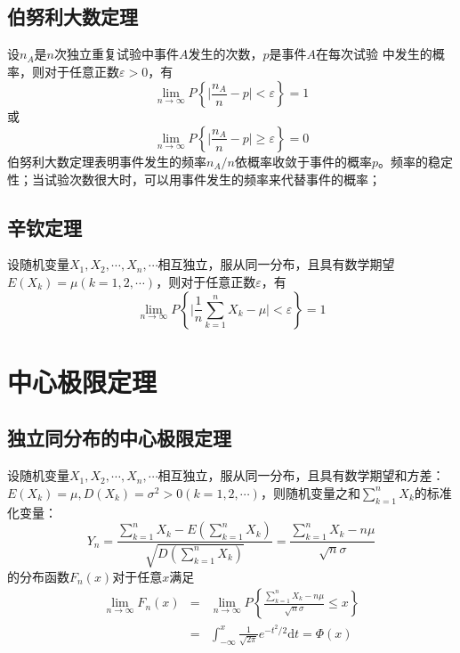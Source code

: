 \documentclass[12pt,a4paper]{article}
\newcommand{\dif}{\mathrm{d}}
\begin{document}
\subsection{伯努利大数定理}

设$n_A$是$n$次独立重复试验中事件$A$发生的次数，$p$是事件$A$在每次试验 中发生的概率，则对于任意正数$\varepsilon > 0$，有
\begin{equation}
\lim_{n\rightarrow \infty} P\left \{\bigg|\frac{n_A}{n}  -p \bigg| < \varepsilon \right \} = 1
\end{equation}
或
\begin{equation}
\lim_{n\rightarrow \infty} P\left \{\bigg|\frac{n_A}{n}  -p \bigg| \geqslant \varepsilon \right \} = 0
\end{equation}
伯努利大数定理表明事件发生的频率$n_A/n$依概率收敛于事件的概率$p$。频率的稳定性；当试验次数很大时，可以用事件发生的频率来代替事件的概率；

\subsection{辛钦定理}
设随机变量$X_1, X_2, \cdots, X_n, \cdots$相互独立，服从同一分布，且具有数学期望$E(X_k) = \mu (k = 1, 2, \cdots)$，则对于任意正数$\varepsilon$，有
\begin{equation}
\lim_{n\rightarrow \infty} P\left \{\bigg|\frac{1}{n} \sum_{k=1}^n X_k -\mu \bigg| < \varepsilon \right \} = 1
\end{equation}



\section{中心极限定理}
\subsection{独立同分布的中心极限定理}
设随机变量$X_1, X_2, \cdots, X_n, \cdots$相互独立，服从同一分布，且具有数学期望和方差：$E(X_k) = \mu, D(X_k) = \sigma^2 > 0 (k = 1, 2, \cdots)$，则随机变量之和$\sum\limits_{k=1}^n X_k$的标准化变量：
\begin{equation}
Y_n = \frac{\sum\limits_{k=1}^n X_k -E\left(\sum\limits_{k=1}^n X_k \right)}{\sqrt{D\left(\sum\limits_{k=1}^n X_k \right)}} = \frac{\sum\limits_{k=1}^n X_k - n\mu}{\sqrt{n} \sigma}
\end{equation}
的分布函数$F_n(x)$对于任意$x$满足
\begin{eqnarray}
\nonumber \lim_{n\rightarrow \infty} F_n(x) &=& \lim_{n\rightarrow \infty} P\left\{\frac{\sum\limits_{k=1}^n X_k - n\mu}{\sqrt{n} \sigma} \leqslant x \right\} \\
&=& \int_{-\infty}^x \frac{1}{\sqrt{2\pi}} e^{-t^2/2} \dif t = \Phi(x) 
\end{eqnarray}
\end{document}
